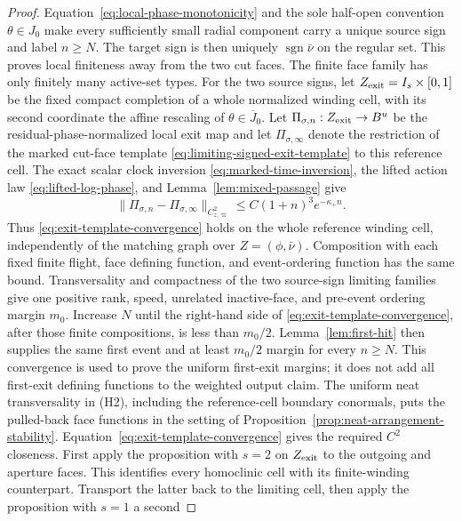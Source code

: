 \documentclass[11pt]{amsart}
\numberwithin{equation}{section}
\theoremstyle{definition}
\theoremstyle{remark}
\begin{document}
\begin{proof}
Equation~\eqref{eq:local-phase-monotonicity} and the sole half-open
convention $\theta\in J_0$ make every sufficiently small radial component
carry a unique source sign and label $n\ge N$.  The target sign is then
uniquely $\operatorname{sgn}\bar\nu$ on the regular set.  This proves local
finiteness away from the two cut faces.  The finite face family has only
finitely many active-set types.
For the two source signs, let $Z_{\rm exit}=I_s\times[0,1]$ be the fixed
compact completion of a whole normalized winding cell, with its second
coordinate the affine rescaling of $\theta\in\overline J_0$.  Let
$\Pi_{\sigma,n}:Z_{\rm exit}\to B^u$ be the
residual-phase-normalized local exit map
and let $\Pi_{\sigma,\infty}$ denote the restriction of the marked
cut-face template \eqref{eq:limiting-signed-exit-template} to this
reference cell.  The exact scalar clock
inversion \eqref{eq:marked-time-inversion}, the lifted action law
\eqref{eq:lifted-log-phase}, and Lemma~\ref{lem:mixed-passage} give
\begin{equation}\label{eq:exit-template-convergence}
 \|\Pi_{\sigma,n}-\Pi_{\sigma,\infty}\|_{C^2_{z,\varpi}}
 \le C(1+n)^3e^{-\kappa_+n}.
\end{equation}
Thus \eqref{eq:exit-template-convergence} holds on the whole reference
winding cell,
independently of the matching graph over $Z=(\phi,\bar\nu)$.  Composition
with each fixed finite flight, face defining function, and event-ordering function
has the same bound.  Transversality and compactness of the two source-sign
limiting families give one positive rank, speed, unrelated inactive-face,
and pre-event ordering margin $m_0$.  Increase $N$ until the right-hand side of
\eqref{eq:exit-template-convergence}, after those finite compositions, is
less than $m_0/2$.  Lemma~\ref{lem:first-hit} then supplies the same first
event and at least $m_0/2$ margin for every $n\ge N$.  This convergence is
used to prove the uniform first-exit margins; it does not add all first-exit
defining functions to the weighted output claim.  The uniform neat
transversality in \textup{(H2)}, including the reference-cell boundary
conormals, puts the pulled-back face functions in the setting of
Proposition~\ref{prop:neat-arrangement-stability}.
Equation~\eqref{eq:exit-template-convergence} gives the required $C^2$
closeness.  First apply the proposition with $s=2$ on
$Z_{\rm exit}$ to the outgoing and aperture faces.  This identifies every
homoclinic cell with its finite-winding counterpart.  Transport the latter
back to the limiting cell, then apply the proposition with $s=1$ a second

\end{proof}
\end{document}
